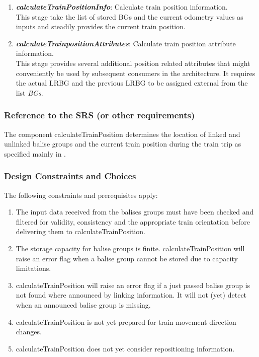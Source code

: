\begin{enumerate}
\item \textbf{\textit{calculateTrainPositionInfo}}: Calculate train position information.\\
This stage take the list of stored BGs and the current odometry values as inputs and steadily provides the current train position. 

\item \textbf{\textit{calculateTrainpositionAttributes}}: Calculate train position attribute information.\\
This stage provides several additional position related attributes that might conveniently be used by subsequent consumers in the architecture. It requires the actual LRBG and the previous LRBG to be assigned external from the list \textit{BGs}. 
\end{enumerate}

\subsubsection{Reference to the SRS (or other requirements)}
The component calculateTrainPosition determines the location of linked and unlinked balise groups and the current train position during the train trip as specified mainly in \cite[Chapter~3.6]{subset-026}.

\subsubsection{Design Constraints and Choices}
The following constraints and prerequisites apply:
\begin{enumerate}
\item The input data received from the balises groups must have been checked and filtered for validity, consistency and the appropriate train orientation before delivering them to calculateTrainPosition. 
\item The storage capacity for balise groups is finite. calculateTrainPosition will raise an error flag when a balise group cannot be stored due to capacity limitations.
\item calculateTrainPosition will raise an error flag if a just passed balise group is not found where announced by linking information. It will not (yet) detect when an announced balise group is missing. 
\item calculateTrainPosition is not yet prepared for train movement direction changes. 
\item calculateTrainPosition does not yet consider repositioning information.
\end{enumerate}



